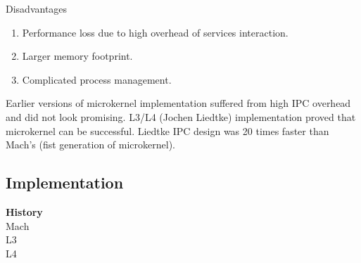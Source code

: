\documentclass{article}
\begin{document}
    Disadvantages
    \begin{enumerate}[-, leftmargin = 0.7cm, nosep]
    \item Performance loss due to high overhead of services interaction.
    \item Larger memory footprint.  \item Complicated process management.  \end{enumerate}

    Earlier versions of microkernel implementation suffered from high IPC overhead and
    did not look promising. L3/L4 (Jochen Liedtke) implementation proved that microkernel can be successful.
    Liedtke IPC design was 20 times faster than Mach's (fist generation of microkernel).


       \pagebreak
    
    \subsection{Implementation}
    \textbf{History}\\

    Mach\\

    L3\\

    L4\\
\end{document}
